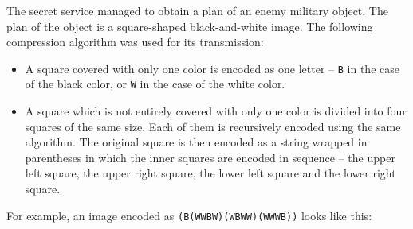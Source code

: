
\usepackage{pgf,tikz}





The secret service managed to obtain a plan of an enemy military object. The
plan of the object is a square-shaped black-and-white image. The following
compression algorithm was used for its transmission:

\begin{itemize}[nolistsep]

\item A square covered with only one color is encoded as one letter --
  \texttt{B} in the case of the black color, or \texttt{W} in the case of the
  white color.

\item A square which is not entirely covered with only one color is divided into
  four squares of the same size. Each of them is recursively encoded using the
  same algorithm. The original square is then encoded as a string wrapped in
  parentheses in which the inner squares are encoded in sequence -- the upper
  left square, the upper right square, the lower left square and the lower right
  square.

\end{itemize}

For example, an image encoded as \texttt{(B(WWBW)(WBWW)(WWWB))} looks like this:

\begin{center}
\end{center}

